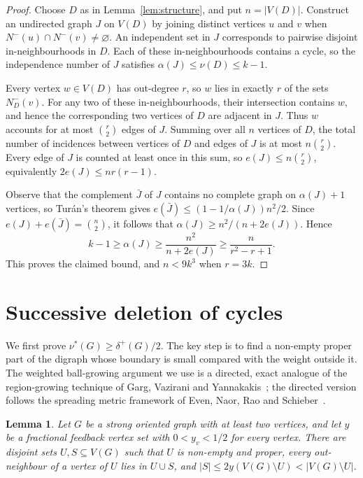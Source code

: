 \documentclass[a4paper,12pt]{article}
\newtheorem{lemma}[theorem]{Lemma}
\numberwithin{equation}{section}
\newcommand{\jbjcomment}[1]{\textcolor{blue}{JBJ: #1}}
\begin{document}
\begin{proof}
Choose $D$ as in Lemma~\ref{lem:structure}, and put $n=|V(D)|$.
Construct an undirected graph $J$ on $V(D)$ by joining distinct vertices
$u$ and $v$ when $N^-(u)\cap N^-(v)\ne\varnothing$.
An independent set in $J$ corresponds to pairwise disjoint
in-neighbourhoods in $D$. Each of these in-neighbourhoods contains
a cycle, so the independence number of $J$ satisfies
$\alpha(J)\le\nu(D)\le k-1$.

Every vertex $w\in V(D)$ has out-degree $r$, so $w$ lies in exactly $r$
of the sets $N_D^-(v)$. For any two of these in-neighbourhoods, their
intersection contains $w$, and hence the corresponding two vertices of
$D$ are adjacent in $J$. Thus $w$ accounts for at most $\binom r2$
edges of $J$. Summing over all $n$ vertices of $D$, the total number of
incidences between vertices of $D$ and edges of $J$ is at most
$n\binom r2$. Every edge of $J$ is counted at least once in this sum, so
$e(J)\le n\binom r2$, equivalently $2e(J)\le nr(r-1)$.

Observe that the complement
$\bar{J}$ of $J$ contains no complete graph on $\alpha(J)+1$ vertices, so
Tur\'an's theorem gives $e(\bar{J})\le(1-1/\alpha(J))n^2/2$.
Since $e(J)+e(\bar{J})=\binom n2$, it follows that
$\alpha(J)\ge n^2/(n+2e(J))$. Hence
$$
 k-1\ge\alpha(J)\ge\frac{n^2}{n+2e(J)}\ge\frac{n}{r^2-r+1}.
$$
This proves the claimed bound, and $n<9k^3$ when $r=3k$.
\end{proof}


\section{Successive deletion of cycles}\label{sec:iteration}


We first prove $\nu^\ast(G)\ge\delta^+(G)/2$. The key step is to find a non-empty
proper part of the digraph whose boundary  %
is small compared with the
weight outside it. The weighted ball-growing argument we use is a
directed, exact analogue of the region-growing technique of Garg,
Vazirani and Yannakakis~\cite{gargSJC25}; the directed version follows the
spreading metric framework of Even, Naor, Rao and Schieber~\cite{evenJACM47}.


\begin{lemma}\label{lem:boundary}
Let $G$ be a strong oriented graph   
with at least two vertices, and let $y$ be a
fractional feedback vertex set with $0<y_v<1/2$ for every vertex.
There are disjoint sets $U,S\subseteq V(G)$ such that $U$ is non-empty
and proper, every out-neighbour of a vertex of $U$ lies in $U\cup S$,
and $|S|\le 2y(V(G)\setminus U)< |V(G)\setminus U|$.
\end{lemma}
\end{document}
